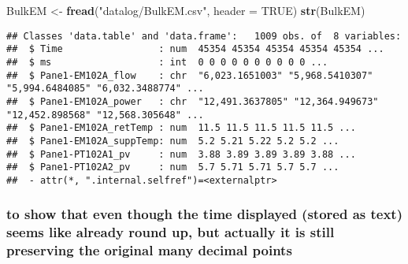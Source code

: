 \documentclass[
]{article}
\newenvironment{Shaded}{\begin{snugshade}}{\end{snugshade}}
\newcommand{\AttributeTok}[1]{\textcolor[rgb]{0.13,0.29,0.53}{#1}}
\newcommand{\ConstantTok}[1]{\textcolor[rgb]{0.56,0.35,0.01}{#1}}
\newcommand{\DecValTok}[1]{\textcolor[rgb]{0.00,0.00,0.81}{#1}}
\newcommand{\FunctionTok}[1]{\textcolor[rgb]{0.13,0.29,0.53}{\textbf{#1}}}
\newcommand{\NormalTok}[1]{#1}
\newcommand{\OtherTok}[1]{\textcolor[rgb]{0.56,0.35,0.01}{#1}}
\newcommand{\SpecialCharTok}[1]{\textcolor[rgb]{0.81,0.36,0.00}{\textbf{#1}}}
\newcommand{\StringTok}[1]{\textcolor[rgb]{0.31,0.60,0.02}{#1}}
\begin{document}
\begin{Shaded}
\begin{Highlighting}[]
\NormalTok{BulkEM }\OtherTok{\textless{}{-}} \FunctionTok{fread}\NormalTok{(}\StringTok{"datalog/BulkEM.csv"}\NormalTok{, }\AttributeTok{header =} \ConstantTok{TRUE}\NormalTok{)}
\FunctionTok{str}\NormalTok{(BulkEM)}
\end{Highlighting}
\end{Shaded}

\begin{verbatim}
## Classes 'data.table' and 'data.frame':   1009 obs. of  8 variables:
##  $ Time                 : num  45354 45354 45354 45354 45354 ...
##  $ ms                   : int  0 0 0 0 0 0 0 0 0 0 ...
##  $ Pane1-EM102A_flow    : chr  "6,023.1651003" "5,968.5410307" "5,994.6484085" "6,032.3488774" ...
##  $ Pane1-EM102A_power   : chr  "12,491.3637805" "12,364.949673" "12,452.898568" "12,568.305648" ...
##  $ Pane1-EM102A_retTemp : num  11.5 11.5 11.5 11.5 11.5 ...
##  $ Pane1-EM102A_suppTemp: num  5.2 5.21 5.22 5.2 5.2 ...
##  $ Pane1-PT102A1_pv     : num  3.88 3.89 3.89 3.89 3.88 ...
##  $ Pane1-PT102A2_pv     : num  5.7 5.71 5.71 5.7 5.7 ...
##  - attr(*, ".internal.selfref")=<externalptr>
\end{verbatim}

\hypertarget{to-show-that-even-though-the-time-displayed-stored-as-text-seems-like-already-round-up-but-actually-it-is-still-preserving-the-original-many-decimal-points}{%
\subsubsection{to show that even though the time displayed (stored as
text) seems like already round up, but actually it is still preserving
the original many decimal
points}\label{to-show-that-even-though-the-time-displayed-stored-as-text-seems-like-already-round-up-but-actually-it-is-still-preserving-the-original-many-decimal-points}}

\begin{Shaded}
\end{Shaded}
\end{document}
